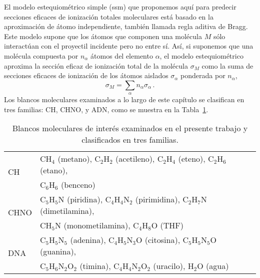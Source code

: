 El modelo estequiométrico simple (\acs{ssm}) que proponemos aquí para 
predecir secciones eficaces de ionización totales moleculares está basado 
en la aproximación de átomo independiente, también llamada regla aditiva 
de Bragg. Este modelo supone que los átomos que componen una molécula $M$ 
sólo interactúan con el proyectil incidente pero no entre sí. Así, si 
suponemos que una molécula compuesta por $n_{\alpha}$ átomos del elemento 
$\alpha$, el modelo estequiométrico aproxima la sección eficaz de 
ionización total de la molécula $\sigma_M$ como la suma de secciones 
eficaces de ionización de los átomos aislados $\sigma_{\alpha}$ ponderada 
por $n_{\alpha}$, 
\begin{equation}
\sigma_{M}=\sum\limits_{\alpha}n_{\alpha}\sigma_{\alpha}\,.  
\label{eq:sumion}
\end{equation}
Los blancos moleculares examinados a lo largo de este capítulo se 
clasifican en tres familias: CH, CHNO, y ADN, como se muestra en la 
Tabla~\ref{tab:families}.

\begin{table}
\begin{center}
\begin{tabular}{|p{}|p{}|}
\hline
\multirow{2}{*}{CH} & CH$_4$ (metano), C$_2$H$_2$ (acetileno), 
C$_2$H$_4$ (eteno), C$_2$H$_6$ (etano), \\ & C$_6$H$_6$ (benceno) \\
\hline
\multirow{2}{*}{CHNO} & C$_5$H$_5$N (piridina), C$_4$H$_4$N$_2$ (pirimidina), 
C$_2$H$_7$N (dimetilamina), \\ & CH$_5$N (monometilamina), 
C$_4$H$_8$O (THF) \\[0.2em]
\hline
\multirow{2}{*}{DNA} & C$_5$H$_5$N$_5$ (adenina), C$_4$H$_5$N$_3$O (citosina), 
C$_5$H$_5$N$_5$O (guanina), \\ & C$_5$H$_6$N$_2$O$_2$ (timina),
C$_4$H$_4$N$_2$O$_2$ (uracilo), H$_2$O (agua) \\
\hline
\end{tabular}
\caption[Blancos moleculares examinados y clasificados en tres familias.]
{Blancos moleculares de interés examinados en el presente trabajo y 
clasificados en tres familias.}
\label{tab:families}
\end{center}
\end{table}

